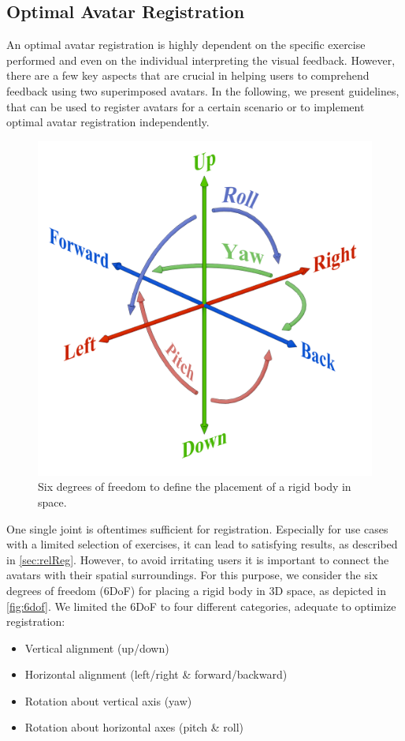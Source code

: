 \subsection*{Optimal Avatar Registration \label{sec:optimalReg}}
An optimal avatar registration is highly dependent on the specific exercise performed and even on the individual interpreting the visual feedback. However, there are a few key aspects that are crucial in helping users to comprehend feedback using two superimposed avatars. In the following, we present guidelines, that can be used to register avatars for a certain scenario or to implement optimal avatar registration independently.

\begin{figure}[h]
	\centering
	\includegraphics[width=0.5\linewidth]{pictures/Gizmos.png}
	\caption{Six degrees of freedom to define the placement of a rigid body in space.}
	\label{fig:6dof}
\end{figure}

One single joint is oftentimes sufficient for registration. Especially for use cases with a limited selection of exercises, it can lead to satisfying results, as described in \autoref{sec:relReg}. However, to avoid irritating users it is important to connect the avatars with their spatial surroundings. For this purpose, we consider the six degrees of freedom (6DoF) for placing a rigid body in 3D space, as depicted in \autoref{fig:6dof}. We limited the 6DoF to four different categories, adequate to optimize registration:
\begin{itemize}
	\setlength{\itemsep}{-0.3cm}
	\item Vertical alignment (up/down)
	\item Horizontal alignment (left/right \& forward/backward)
	\item Rotation about vertical axis (yaw)
	\item Rotation about horizontal axes (pitch \& roll)
\end{itemize}

